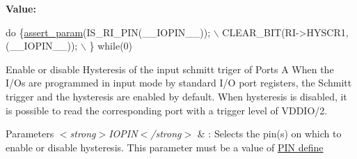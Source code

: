 {\bfseries Value\-:}
\begin{DoxyCode}
\textcolor{keywordflow}{do} \{\hyperlink{stm32l1xx__hal__conf_8h_a631dea7b230e600555f979c62af1de21}{assert\_param}(IS\_RI\_PIN(\_\_IOPIN\_\_)); \(\backslash\)
            CLEAR\_BIT(RI->HYSCR1, (\_\_IOPIN\_\_)); \(\backslash\)
          \} \textcolor{keywordflow}{while}(0)
\end{DoxyCode}


Enable or disable Hysteresis of the input schmitt triger of Ports A When the I/\-Os are programmed in input mode by standard I/\-O port registers, the Schmitt trigger and the hysteresis are enabled by default. When hysteresis is disabled, it is possible to read the corresponding port with a trigger level of V\-D\-D\-I\-O/2. 


\begin{DoxyParams}{Parameters}
{\em $<$strong$>$\-I\-O\-P\-I\-N$<$/strong$>$} & \-: Selects the pin(s) on which to enable or disable hysteresis. This parameter must be a value of \hyperlink{group___r_i___pin}{P\-I\-N define} \\
\hline
\end{DoxyParams}

